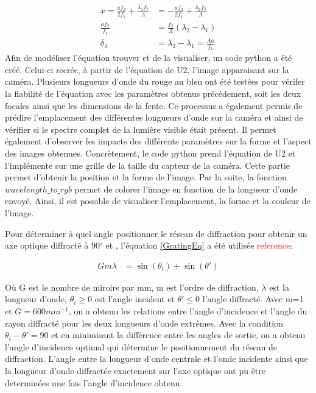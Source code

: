 \documentclass[conference]{IEEEtran}
\begin{document}
\begin{align*}
    x=\frac{a f_2}{2f_1}+\frac{\lambda_1 f_2}{\Lambda}&=-\frac{a f_2}{2f_1}+\frac{\lambda_2 f_2}{\Lambda}\\
    \frac{af_2}{f_1}&=\frac{f_2}{\Lambda}(\lambda_2-\lambda_1)\\
    \delta_{\lambda}&=\lambda_2-\lambda_1=\frac{\Lambda a}{f_1}
\end{align*}
Afin de modéliser l'équation trouver et de la visualiser, un code python a été créé. Celui-ci recrée, à partir de l'équation
de U2, l'image apparaisant sur la caméra. Plusieurs longueurs d'onde du rouge au bleu ont été testées pour vérifer 
la fiabilité de l'équation avec les paramètres obtenus précédement, soit les deux focales ainsi que les dimensions de la fente. 
Ce processus a également permis de prédire l'emplacement des différentes longueurs d'onde sur la caméra 
et ainsi de vérifier si le spectre complet de la lumière visible était présent. Il permet également d'observer les
impacts des différents paramètres sur la forme et l'aspect des images obtenues. Concrètement, le code python prend 
l'équation de U2 et l'implémente sur une grille de la taille du capteur de la caméra. Cette partie permet d'obtenir 
la position et la forme de l'image. Par la suite, la fonction $wavelength\_to\_rgb$ permet de colorer l'image en fonction
de la longueur d'onde envoyé. Ainsi, il est possible de visualiser l'emplacement, la forme et la couleur de l'image.    

Pour déterminer à quel angle positionner le réseau de diffraction pour 
obtenir un axe optique diffracté à 90$^{\circ}$ et , l'équation \ref{GratingEq} a été utilisée \textcolor{red}{reference}:

\begin{align}\label{GratingEq}
    G m \lambda &= \sin(\theta_i) + \sin(\theta')
\end{align}

Où G est le nombre de miroirs par mm, m est l'ordre de diffraction, $\lambda$ est la longueur d'onde,
$\theta_i \ge 0$ est l'angle incident et $\theta' \le 0$ l'angle diffracté. Avec m=1 et $G=600mm^{-1}$, 
on a obtenu les relations entre l'angle d'incidence et l'angle du rayon diffracté pour les deux longueurs 
d'onde extrêmes. Avec la condition $\theta_i-\theta'=90$ et en minimisant la différence entre les angles 
de sortie, on a obtenu l'angle d'incidence optimal qui détermine le positionnement du réseau de diffraction.
L'angle entre la longueur d'onde centrale et l'onde incidente ainsi que la longueur d'onde diffractée 
exactement sur l'axe optique ont pu être determinées une fois l'angle d'incidence obtenu.
\end{document}
